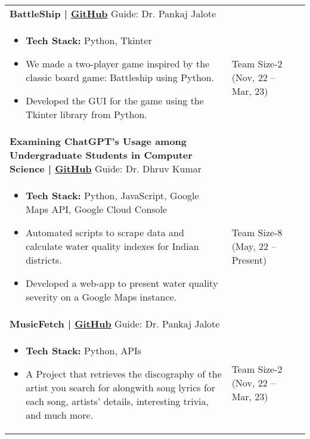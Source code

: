 \documentclass[10pt]{extarticle}
\begin{document}
\begin{contained}
\begin{longtable}{p{}p{}p{}}
    \textbf{BattleShip | \href{https://github.com/encryptedcation/NoDoubt}{GitHub}}\newline
    Guide: Dr. Pankaj Jalote\\
    \vspace{-4mm}
    \begin{itemize}
        \item \textbf{Tech Stack:} Python, Tkinter
        \item We made a two-player game inspired by the classic board game: Battleship using Python.
        \item Developed the GUI for the game using the Tkinter library from Python.
    \end{itemize}
    \vspace{-4mm}
    &Team Size-2
    \newline (Nov, 22 – Mar, 23)\\
        \textbf{Examining ChatGPT’s
Usage among Undergraduate Students in Computer Science | \href{https://github.com/HydroHomiesIIITD/hydrohomiesiiitd.github.io}{GitHub}}\newline
    Guide: Dr. Dhruv Kumar\\
    \vspace{-4mm}
    \begin{itemize}
        \item \textbf{Tech Stack:} Python, JavaScript, Google Maps API, Google Cloud Console
        \item Automated scripts to scrape data and calculate water quality indexes for Indian districts.
        \item Developed a web-app to present water quality severity on a Google Maps instance.
    \end{itemize}
    \vspace{-4mm}
    &Team Size-8
    \newline (May, 22 – Present)\\
    \textbf{MusicFetch | \href{https://github.com/encryptedcation/NoDoubt}{GitHub}}\newline
    Guide: Dr. Pankaj Jalote\\
    \vspace{-4mm}
    \begin{itemize}
        \item \textbf{Tech Stack:} Python, APIs
        \item A Project that retrieves the discography of the artist you search for alongwith song lyrics for each song, artists' details, interesting trivia, and much more.
    \end{itemize}
    \vspace{-4mm}
    &Team Size-2
    \newline (Nov, 22 – Mar, 23)\\
    
    
\end{longtable}
\end{contained}
\end{document}
